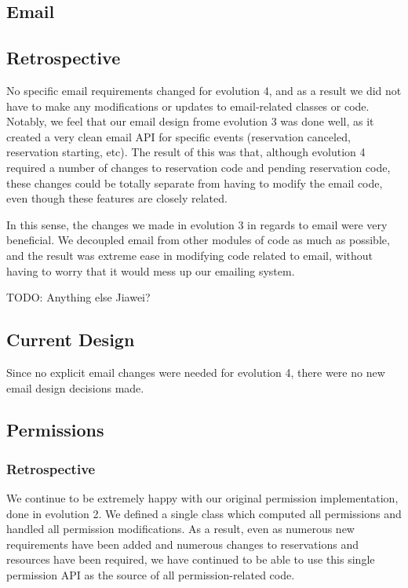 \documentclass[12pt]{article}
\begin{document}
\subsection{Email}
\subsection{Retrospective}
No specific email requirements changed for evolution 4, and as a result we did not have to make any modifications or updates to email-related classes or code. Notably, we feel that our email design frome evolution 3 was done well, as it created a very clean email API for specific events (reservation canceled, reservation starting, etc). The result of this was that, although evolution 4 required a number of changes to reservation code and pending reservation code, these changes could be totally separate from having to modify the email code, even though these features are closely related. 

In this sense, the changes we made in evolution 3 in regards to email were very beneficial. We decoupled email from other modules of code as much as possible, and the result was extreme ease in modifying code related to email, without having to worry that it would mess up our emailing system. 

TODO: Anything else Jiawei?

\subsection{Current Design}
Since no explicit email changes were needed for evolution 4, there were no new email design decisions made. 


\subsection{Permissions}
\subsubsection{Retrospective}
We continue to be extremely happy with our original permission implementation, done in evolution 2. We defined a single class which computed all permissions and handled all permission modifications. As a result, even as numerous new requirements have been added and numerous changes to reservations and resources have been required, we have continued to be able to use this single permission API as the source of all permission-related code. 
\end{document}
